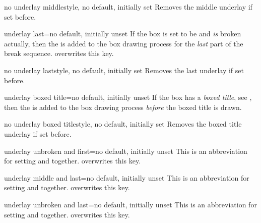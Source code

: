 \begin{docTcbKey}{no underlay middle}{}{style, no default, initially set}
  Removes the middle underlay if set before.
\end{docTcbKey}

\begin{docTcbKey}{underlay last}{=}{no default, initially unset}
  If the box is set to be  and \emph{is} broken actually,
  then the  is added to the box drawing process for
  the \emph{last} part of the break sequence.
   overwrites this key.
\end{docTcbKey}

\begin{docTcbKey}{no underlay last}{}{style, no default, initially set}
  Removes the last underlay if set before.
\end{docTcbKey}

\begin{docTcbKey}{underlay boxed title}{=}{no default, initially unset}
  If the box has a \emph{boxed title}, see ,
  then the  is added to the box drawing process
  \emph{before} the boxed title is drawn.
\end{docTcbKey}

\begin{docTcbKey}{no underlay boxed title}{}{style, no default, initially set}
  Removes the boxed title underlay if set before.
\end{docTcbKey}

\begin{docTcbKey}{underlay unbroken and first}{=}{no default, initially unset}
  This is an abbreviation for setting
   and
   together.
   overwrites this key.
\end{docTcbKey}

\begin{docTcbKey}{underlay middle and last}{=}{no default, initially unset}
  This is an abbreviation for setting
   and
   together.
   overwrites this key.
\end{docTcbKey}

\begin{docTcbKey}{underlay unbroken and last}{=}{no default, initially unset}
  This is an abbreviation for setting
   and
   together.
   overwrites this key.
\end{docTcbKey}

